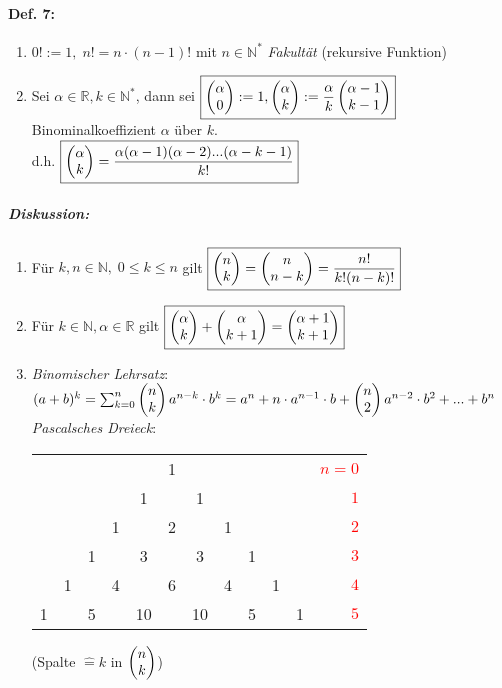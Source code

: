 \paragraph{Def. 7:}
\begin{enumerate}[label=\alph*.)]
\item $\boxed{0! := 1, \; n!=n\cdot (n-1)!}$ mit $n\in \mathbb{N}^*$ \emph{Fakultät} (rekursive Funktion)
\item Sei $\alpha \in \mathbb{R}, k\in \mathbb{N}^*$, dann sei $\boxed{\begin{pmatrix}\alpha\\0\end{pmatrix}:=1, \begin{pmatrix}\alpha\\k\end{pmatrix}:= \frac{\alpha}{k}\begin{pmatrix}\alpha-1\\k-1\end{pmatrix}}$ Binominalkoeffizient $\alpha$ über $k$.\\
d.h. $\boxed{\begin{pmatrix}\alpha\\k\end{pmatrix}= \frac{\alpha(\alpha-1)(\alpha-2)...(\alpha-k-1)}{k!}}$
\end{enumerate}

\subparagraph{Diskussion:}
\begin{enumerate}
\item Für $k, n \in \mathbb{N}, \; 0 \leq k \leq n$ gilt $\boxed{\begin{pmatrix}n\\k\end{pmatrix}=\begin{pmatrix}n\\n-k\end{pmatrix}=\frac{n!}{k!(n-k)!}}$
\item Für $k \in \mathbb{N}, \alpha \in \mathbb{R}$ gilt $\boxed{\begin{pmatrix}\alpha\\k\end{pmatrix}+\begin{pmatrix}\alpha\\k+1\end{pmatrix}=\begin{pmatrix}\alpha+1\\k+1\end{pmatrix}}$
\item \emph{Binomischer Lehrsatz}: $(a+b)^k=\sum_{k=0}^n \begin{pmatrix}n\\k\end{pmatrix} a^{n-k} \cdot b^k=a^n+n\cdot a^{n-1} \cdot b + \begin{pmatrix}n\\2\end{pmatrix}a^{n-2}\cdot b^2+...+b^n$\\
\emph{Pascalsches Dreieck}:
\begin{tabular}{c c c c c c c c c c c r}
   &   &   &   &   & 1 &   &   &   &   &   & \textcolor{red}{$n=0$} \\
   &   &   &   & 1 &   & 1 &   &   &   &   & \textcolor{red}{$1$} \\
   &   &   & 1 &   & 2 &   & 1 &   &   &   & \textcolor{red}{$2$} \\
   &   & 1 &   & 3 &   & 3 &   & 1 &   &   & \textcolor{red}{$3$} \\
   & 1 &   & 4 &   & 6 &   & 4 &   & 1 &   & \textcolor{red}{$4$} \\
 1 &   & 5 &   & 10&   & 10&   & 5 &   & 1 & \textcolor{red}{$5$} \\

\end{tabular}
(Spalte $\widehat{=}k$ in $\begin{pmatrix}n\\k\end{pmatrix}$)
\end{enumerate}

